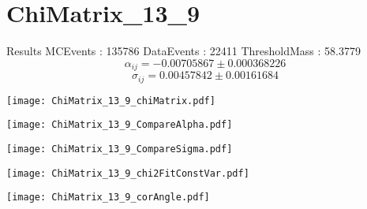 \documentclass[a4paper,12pt]{article}
\begin{document}
\section{ChiMatrix\_13\_9}
\begin{minipage}{0.49\linewidth} Results \newline
MCEvents : 135786\newline
DataEvents : 22411 \newline
ThresholdMass : 58.3779\\
$$\alpha_{ij} = -0.00705867\pm 0.000368226$$
$$\sigma_{ij} = 0.00457842\pm 0.00161684$$
\end{minipage}\hfill
\begin{minipage}{0.49\linewidth} 
\texttt{[image: ChiMatrix\_13\_9\_chiMatrix.pdf]}\\
\end{minipage}
\hfill
\begin{minipage}{0.49\linewidth} 
\texttt{[image: ChiMatrix\_13\_9\_CompareAlpha.pdf]}\\
\end{minipage}
\hfill
\begin{minipage}{0.49\linewidth} 
\texttt{[image: ChiMatrix\_13\_9\_CompareSigma.pdf]}\\
\end{minipage}
\begin{minipage}{0.49\linewidth} 
\texttt{[image: ChiMatrix\_13\_9\_chi2FitConstVar.pdf]}\\
\end{minipage}
\hfill
\begin{minipage}{0.49\linewidth} 
\texttt{[image: ChiMatrix\_13\_9\_corAngle.pdf]}\\
\end{minipage}
\end{document}
